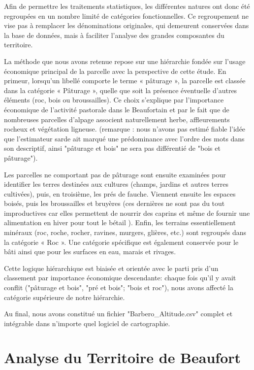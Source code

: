 \documentclass[12pt,a4paper]{report}
\begin{document}
Afin de permettre les traitements statistiques, les différentes natures ont donc été regroupées en un nombre limité de catégories fonctionnelles. Ce regroupement ne vise pas à remplacer les dénominations originales, qui demeurent conservées dans la base de données, mais à faciliter l'analyse des grandes composantes du territoire.

La méthode que nous avons retenue repose sur une hiérarchie fondée sur l'usage économique principal de la parcelle avec la perspective de cette étude. En primeur, lorsqu'un libellé comporte le terme « pâturage », la parcelle est classée dans la catégorie « Pâturage », quelle que soit la présence éventuelle d'autres éléments (roc, bois ou broussailles). Ce choix s'explique par l'importance économique de l'activité pastorale dans le Beaufortain et par le fait que de nombreuses parcelles d'alpage associent naturellement herbe, affleurements rocheux et végétation ligneuse. (remarque : nous n'avons pas estimé fiable l'idée que l'estimateur sarde ait marqué une prédominance avec l'ordre des mots dans son descriptif, ainsi "pâturage et bois" ne sera pas différentié de "bois et pâturage").

Les parcelles ne comportant pas de pâturage sont ensuite examinées pour identifier les terres destinées aux cultures (champs, jardins et autres terres cultivées), puis, en troisième, les prés de fauche. Viennent ensuite les espaces boisés, puis les broussailles et bruyères (ces dernières ne sont pas du tout improductives car elles permettent de nourrir des caprins et même de fournir une alimentation en hiver pour tout le bétail ). Enfin, les terrains essentiellement minéraux (roc, roche, rocher, ravines, murgers, glières, etc.) sont regroupés dans la catégorie « Roc ». Une catégorie spécifique est également conservée pour le bâti ainsi que pour les surfaces en eau, marais et rivages. 

Cette logique hiérarchique est biaisée et orientée avec le parti pris d'un classement par importance économique descendante:  chaque fois qu'il y avait conflit ("pâturage et bois", "pré et bois"; "bois et roc"), nous avons affecté la catégorie supérieure de notre hiérarchie.

Au final, nous avons constitué un fichier "Barbero_Altitude.csv" complet et intégrable dans n'importe quel logiciel de cartographie.

\chapter{Analyse du Territoire de Beaufort}
\end{document}
